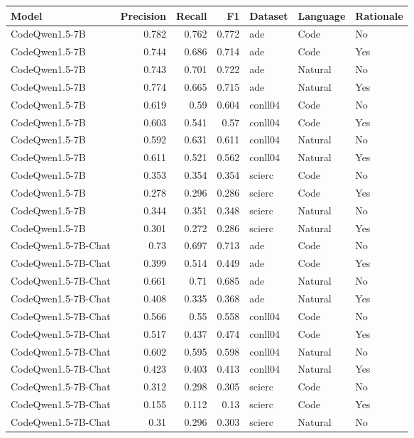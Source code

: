 \begin{tabular}{lrrrlll}
\toprule
Model & Precision & Recall & F1 & Dataset & Language & Rationale \\
\midrule
CodeQwen1.5-7B & 0.782 & 0.762 & 0.772 & ade & Code & No \\
CodeQwen1.5-7B & 0.744 & 0.686 & 0.714 & ade & Code & Yes \\
CodeQwen1.5-7B & 0.743 & 0.701 & 0.722 & ade & Natural & No \\
CodeQwen1.5-7B & 0.774 & 0.665 & 0.715 & ade & Natural & Yes \\
CodeQwen1.5-7B & 0.619 & 0.59 & 0.604 & conll04 & Code & No \\
CodeQwen1.5-7B & 0.603 & 0.541 & 0.57 & conll04 & Code & Yes \\
CodeQwen1.5-7B & 0.592 & 0.631 & 0.611 & conll04 & Natural & No \\
CodeQwen1.5-7B & 0.611 & 0.521 & 0.562 & conll04 & Natural & Yes \\
CodeQwen1.5-7B & 0.353 & 0.354 & 0.354 & scierc & Code & No \\
CodeQwen1.5-7B & 0.278 & 0.296 & 0.286 & scierc & Code & Yes \\
CodeQwen1.5-7B & 0.344 & 0.351 & 0.348 & scierc & Natural & No \\
CodeQwen1.5-7B & 0.301 & 0.272 & 0.286 & scierc & Natural & Yes \\
CodeQwen1.5-7B-Chat & 0.73 & 0.697 & 0.713 & ade & Code & No \\
CodeQwen1.5-7B-Chat & 0.399 & 0.514 & 0.449 & ade & Code & Yes \\
CodeQwen1.5-7B-Chat & 0.661 & 0.71 & 0.685 & ade & Natural & No \\
CodeQwen1.5-7B-Chat & 0.408 & 0.335 & 0.368 & ade & Natural & Yes \\
CodeQwen1.5-7B-Chat & 0.566 & 0.55 & 0.558 & conll04 & Code & No \\
CodeQwen1.5-7B-Chat & 0.517 & 0.437 & 0.474 & conll04 & Code & Yes \\
CodeQwen1.5-7B-Chat & 0.602 & 0.595 & 0.598 & conll04 & Natural & No \\
CodeQwen1.5-7B-Chat & 0.423 & 0.403 & 0.413 & conll04 & Natural & Yes \\
CodeQwen1.5-7B-Chat & 0.312 & 0.298 & 0.305 & scierc & Code & No \\
CodeQwen1.5-7B-Chat & 0.155 & 0.112 & 0.13 & scierc & Code & Yes \\
CodeQwen1.5-7B-Chat & 0.31 & 0.296 & 0.303 & scierc & Natural & No \\

\end{tabular}

